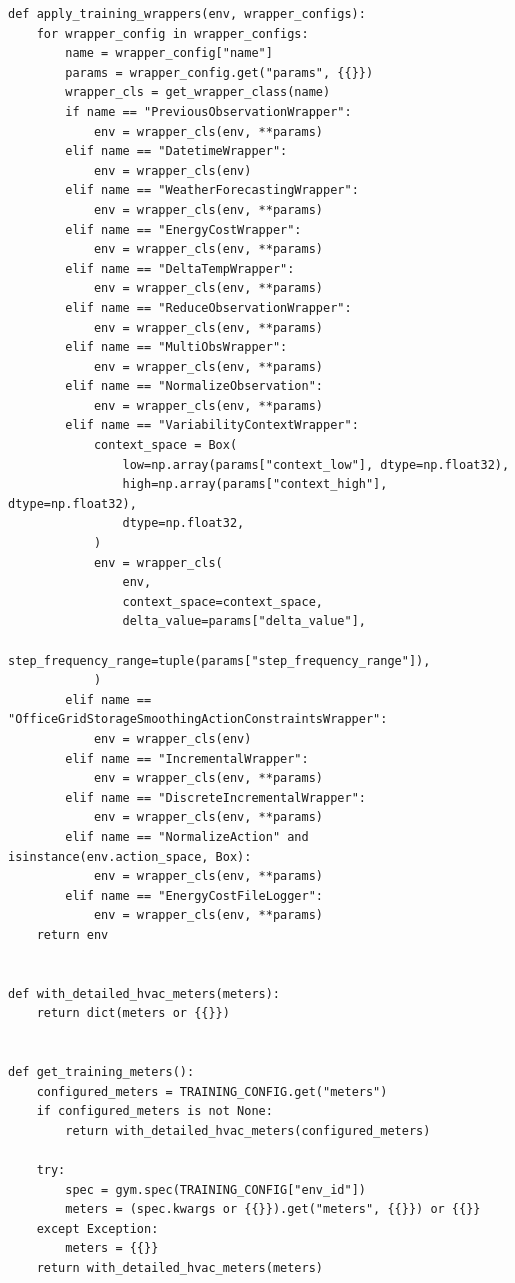 \documentclass[10pt,a4paper]{article}
\begin{document}
\begin{lstlisting}[style=studioPython,caption={backend/training\_scripts.py},label={lst:backend-training-scripts-py}]
def apply_training_wrappers(env, wrapper_configs):
    for wrapper_config in wrapper_configs:
        name = wrapper_config["name"]
        params = wrapper_config.get("params", {{}})
        wrapper_cls = get_wrapper_class(name)
        if name == "PreviousObservationWrapper":
            env = wrapper_cls(env, **params)
        elif name == "DatetimeWrapper":
            env = wrapper_cls(env)
        elif name == "WeatherForecastingWrapper":
            env = wrapper_cls(env, **params)
        elif name == "EnergyCostWrapper":
            env = wrapper_cls(env, **params)
        elif name == "DeltaTempWrapper":
            env = wrapper_cls(env, **params)
        elif name == "ReduceObservationWrapper":
            env = wrapper_cls(env, **params)
        elif name == "MultiObsWrapper":
            env = wrapper_cls(env, **params)
        elif name == "NormalizeObservation":
            env = wrapper_cls(env, **params)
        elif name == "VariabilityContextWrapper":
            context_space = Box(
                low=np.array(params["context_low"], dtype=np.float32),
                high=np.array(params["context_high"], dtype=np.float32),
                dtype=np.float32,
            )
            env = wrapper_cls(
                env,
                context_space=context_space,
                delta_value=params["delta_value"],
                step_frequency_range=tuple(params["step_frequency_range"]),
            )
        elif name == "OfficeGridStorageSmoothingActionConstraintsWrapper":
            env = wrapper_cls(env)
        elif name == "IncrementalWrapper":
            env = wrapper_cls(env, **params)
        elif name == "DiscreteIncrementalWrapper":
            env = wrapper_cls(env, **params)
        elif name == "NormalizeAction" and isinstance(env.action_space, Box):
            env = wrapper_cls(env, **params)
        elif name == "EnergyCostFileLogger":
            env = wrapper_cls(env, **params)
    return env


def with_detailed_hvac_meters(meters):
    return dict(meters or {{}})


def get_training_meters():
    configured_meters = TRAINING_CONFIG.get("meters")
    if configured_meters is not None:
        return with_detailed_hvac_meters(configured_meters)

    try:
        spec = gym.spec(TRAINING_CONFIG["env_id"])
        meters = (spec.kwargs or {{}}).get("meters", {{}}) or {{}}
    except Exception:
        meters = {{}}
    return with_detailed_hvac_meters(meters)



\end{lstlisting}
\end{document}

